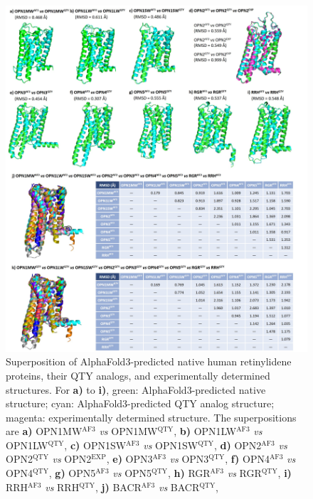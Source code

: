\documentclass[fleqn, 10pt, lineno]{manuscript}
\begin{document}
\begin{figure}[htbp]
	\centering
	\includegraphics[width=\linewidth]{Figures/superposition-human-pairwise.jpg}
	\caption{Superposition of AlphaFold3-predicted native human retinylidene proteins, their QTY analogs, and experimentally determined structures. 
    For \textbf{a)} to \textbf{i)}, green: AlphaFold3-predicted native structure; cyan: AlphaFold3-predicted QTY analog structure; magenta: experimentally determined structure. The superpositions are 
    \textbf{a)} OPN1MW$^{\textrm{AF3}}$ \textit{vs} OPN1MW$^{\textrm{QTY}}$, 
    \textbf{b)} OPN1LW$^{\textrm{AF3}}$ \textit{vs} OPN1LW$^{\textrm{QTY}}$, 
    \textbf{c)} OPN1SW$^{\textrm{AF3}}$ \textit{vs} OPN1SW$^{\textrm{QTY}}$, 
    \textbf{d)} OPN2$^{\textrm{AF3}}$ \textit{vs} OPN2$^{\textrm{QTY}}$ \textit{vs} OPN2$^{\textrm{EXP}}$, 
    \textbf{e)} OPN3$^{\textrm{AF3}}$ \textit{vs} OPN3$^{\textrm{QTY}}$, 
    \textbf{f)} OPN4$^{\textrm{AF3}}$ \textit{vs} OPN4$^{\textrm{QTY}}$, 
    \textbf{g)} OPN5$^{\textrm{AF3}}$ \textit{vs} OPN5$^{\textrm{QTY}}$, 
    \textbf{h)} RGR$^{\textrm{AF3}}$ \textit{vs} RGR$^{\textrm{QTY}}$, 
    \textbf{i)} RRH$^{\textrm{AF3}}$ \textit{vs} RRH$^{\textrm{QTY}}$, 
    \textbf{j)} BACR$^{\textrm{AF3}}$ \textit{vs} BACR$^{\textrm{QTY}}$, 
}
\end{figure}
\end{document}
